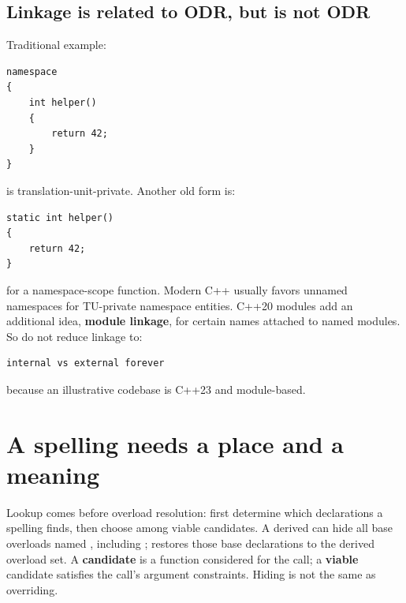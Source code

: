 \subsection{Linkage is related to ODR, but is not ODR}\label{01-foundations-i-ch002-linkage-is-related-to-odr-but-is-not-odr}

\hypertarget{01-foundations-i-ch002-linkage-is-related-to-odr-but-is-not-odr}{}

Traditional example:

\begin{verbatim}
namespace
{
    int helper()
    {
        return 42;
    }
}
\end{verbatim}

 is translation-unit-private. Another old form is:

\begin{verbatim}
static int helper()
{
    return 42;
}
\end{verbatim}

for a namespace-scope function. Modern C++ usually favors unnamed namespaces for TU-private namespace entities. C++20 modules add an additional idea, \textbf{module linkage}, for certain names attached to named modules. So do not reduce linkage to:

\begin{verbatim}
internal vs external forever
\end{verbatim}

because an illustrative codebase is C++23 and module-based.

\section{A spelling needs a place and a meaning}\label{01-foundations-i-ch002-a-spelling-needs-a-place-and-a-meaning}

\hypertarget{01-foundations-i-ch002-a-spelling-needs-a-place-and-a-meaning}{}

Lookup comes before overload resolution: first determine which declarations a spelling finds, then choose among viable candidates. A derived  can hide all base overloads named , including ;  restores those base declarations to the derived overload set. A \textbf{candidate} is a function considered for the call; a \textbf{viable} candidate satisfies the call's argument constraints. Hiding is not the same as overriding.

